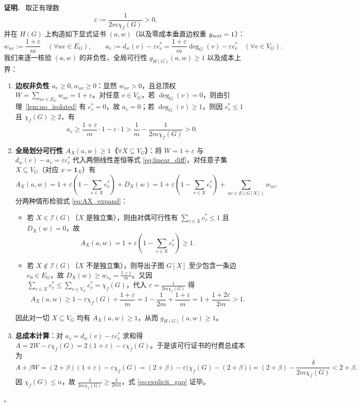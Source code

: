\documentclass[11pt,a4paper]{ctexart}
\theoremstyle{definition}
\newenvironment{proofcn}{\par\noindent\textbf{证明.}\ }{\hfill$\square$\par}
\newcommand{\Ind}{\mathcal I}
\newcommand{\1}{\boldsymbol 1}
\newcommand{\0}{\boldsymbol 0}
\newcommand{\chif}{\chi_f}
\begin{document}
\begin{proofcn}
取正有理数
\begin{equation}\label{eq:eps_choice}
 \varepsilon := \frac{1}{2m\chif(G)} > 0,
\end{equation}
并在 $H(G)$ 上构造如下显式证书 $(a,w)$（以及零成本垂直边权重 $y_{\rm vert}=1$）：
\begin{equation}\label{eq:explicit_cert_HG}
 w_{uv} := \frac{1+\varepsilon}{m}\quad (\forall uv\in E_G),\qquad
 a_v := d_w(v) - \varepsilon c_v^* = \frac{1+\varepsilon}{m}\deg_G(v) - \varepsilon c_v^*\quad (\forall v\in V_G).
\end{equation}
我们来逐一核验 $(a,w)$ 的非负性、全局可行性 $g_{H(G)}(a,w)\ge 1$ 以及成本上界：
\begin{enumerate}[label=(\roman*)]
\item \textbf{边权非负性 $a_v\ge 0, w_{uv}\ge 0$}：显然 $w_{uv}>0$，且总顶权 $W=\sum_{uv\in E_G}w_{uv}=1+\varepsilon$。对任意 $v\in V_G$，若 $\deg_G(v)=0$，则由引理~\ref{lem:no_isolated} 有 $c_v^*=0$，故 $a_v=0$；若 $\deg_G(v)\ge 1$，则因 $c_v^*\le 1$ 且 $\chif(G)\ge 2$，有
\[
 a_v \ge \frac{1+\varepsilon}{m}\cdot 1 - \varepsilon\cdot 1 > \frac{1}{m} - \frac{1}{2m\chif(G)} > 0.
\]
\item \textbf{全局划分可行性 $A_X(a,w)\ge 1$（$\forall X\subseteq V_G$）}：将 $W=1+\varepsilon$ 与 $d_w(v)-a_v=\varepsilon c_v^*$ 代入两侧线性差恒等式 \eqref{eq:linear_diff}，对任意子集 $X\subseteq V_G$（对应 $x=\1_X$）有
\begin{equation}\label{eq:AX_expand}
 A_X(a,w) = 1 + \varepsilon\left(1 - \sum_{v\in X}c_v^*\right) + D_X(w) = 1 + \varepsilon\left(1 - \sum_{v\in X}c_v^*\right) + \sum_{uv\in E(G[X])}w_{uv}.
\end{equation}
分两种情形检验式 \eqref{eq:AX_expand}：
\begin{itemize}
\item 若 $X\in\Ind(G)$（$X$ 是独立集），则由对偶可行性有 $\sum_{v\in X}c_v^*\le 1$ 且 $D_X(w)=0$，故
\[
 A_X(a,w) = 1 + \varepsilon\left(1-\sum_{v\in X}c_v^*\right) \ge 1.
\]
\item 若 $X\notin\Ind(G)$（$X$ 不是独立集），则导出子图 $G[X]$ 至少包含一条边 $e_0\in E_G$，故 $D_X(w)\ge w_{e_0}=\frac{1+\varepsilon}{m}$。又因 $\sum_{v\in X}c_v^*\le \sum_{v\in V_G}c_v^*=\chif(G)$，代入 $\varepsilon=\frac{1}{2m\chif(G)}$ 得
\[
 A_X(a,w) \ge 1 - \varepsilon\chif(G) + \frac{1+\varepsilon}{m}
 = 1 - \frac{1}{2m} + \frac{1+\varepsilon}{m}
 = 1 + \frac{1+2\varepsilon}{2m} > 1.
\]
\end{itemize}
因此对一切 $X\subseteq V_G$ 均有 $A_X(a,w)\ge 1$，从而 $g_{H(G)}(a,w)\ge 1$。
\item \textbf{总成本计算}：对 $a_v=d_w(v)-\varepsilon c_v^*$ 求和得 $A=2W-\varepsilon\chif(G)=2(1+\varepsilon)-\varepsilon\chif(G)$。于是该可行证书的付费总成本为
\[
 A + \beta W = (2+\beta)(1+\varepsilon) - \varepsilon\chif(G)
 = (2+\beta) - \varepsilon\bigl(\chif(G)-(2+\beta)\bigr)
 = (2+\beta) - \frac{\delta}{2m\chif(G)} < 2+\beta.
\]
因 $\chif(G)\le n$，故 $\frac{\delta}{2m\chif(G)}\ge \frac{\delta}{2mn}$，式 \eqref{eq:explicit_gap} 证毕。
\end{enumerate}
\end{proofcn}
\end{document}
